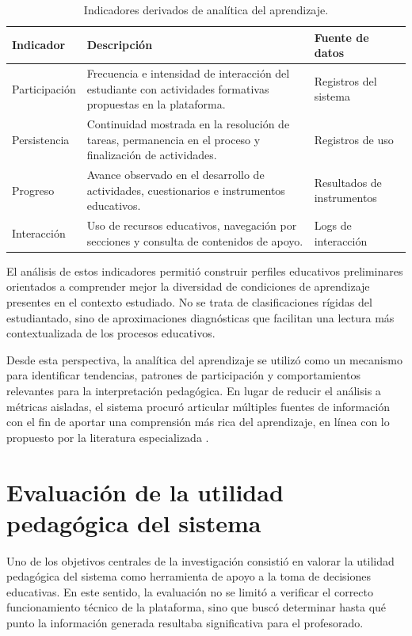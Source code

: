 \begin{refsection}
\begin{table}[htbp]
\centering
\APAtablesetup
\begin{tabularx}{\textwidth}{@{}>{\raggedright\arraybackslash}p{3.0cm}Y>{\raggedright\arraybackslash}p{4.0cm}@{}}
\toprule
\textbf{Indicador} & \textbf{Descripción} & \textbf{Fuente de datos} \\
\midrule
Participación & Frecuencia e intensidad de interacción del estudiante con actividades formativas propuestas en la plataforma. & Registros del sistema \\
Persistencia & Continuidad mostrada en la resolución de tareas, permanencia en el proceso y finalización de actividades. & Registros de uso \\
Progreso & Avance observado en el desarrollo de actividades, cuestionarios e instrumentos educativos. & Resultados de instrumentos \\
Interacción & Uso de recursos educativos, navegación por secciones y consulta de contenidos de apoyo. & Logs de interacción \\
\bottomrule
\end{tabularx}
\caption{Indicadores derivados de analítica del aprendizaje.}
\label{tab:indicadores-aprendizaje}
\end{table}

El análisis de estos indicadores permitió construir perfiles educativos preliminares orientados a comprender mejor la diversidad de condiciones de aprendizaje presentes en el contexto estudiado. No se trata de clasificaciones rígidas del estudiantado, sino de aproximaciones diagnósticas que facilitan una lectura más contextualizada de los procesos educativos.

Desde esta perspectiva, la analítica del aprendizaje se utilizó como un mecanismo para identificar tendencias, patrones de participación y comportamientos relevantes para la interpretación pedagógica. En lugar de reducir el análisis a métricas aisladas, el sistema procuró articular múltiples fuentes de información con el fin de aportar una comprensión más rica del aprendizaje, en línea con lo propuesto por la literatura especializada \parencite{siemenslong2011,ferguson2012}.

\section{Evaluación de la utilidad pedagógica del sistema}

Uno de los objetivos centrales de la investigación consistió en valorar la utilidad pedagógica del sistema como herramienta de apoyo a la toma de decisiones educativas. En este sentido, la evaluación no se limitó a verificar el correcto funcionamiento técnico de la plataforma, sino que buscó determinar hasta qué punto la información generada resultaba significativa para el profesorado.


\end{refsection}
